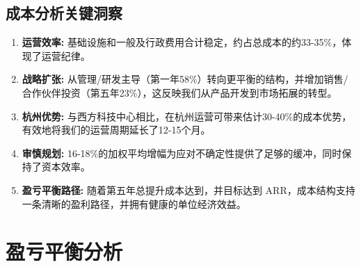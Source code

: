 \documentclass[11点, A4纸, 单面]{article}
\begin{document}
\begin{table}[H]
\centering
\caption{基础设施与平台投资回报率}
\label{tab:infrastructure_roi}
\end{table}

\subsection{成本分析关键洞察}

\begin{enumerate}
    \item \textbf{运营效率:} 基础设施和一般及行政费用合计稳定，约占总成本的约33-35\%，体现了运营纪律。
    
    \item \textbf{战略扩张:} 从管理/研发主导（第一年58\%）转向更平衡的结构，并增加销售/合作伙伴投资（第五年23\%），这反映我们从产品开发到市场拓展的转型。
    
    \item \textbf{杭州优势:} 与西方科技中心相比，在杭州运营可带来估计30-40\%的成本优势，有效地将我们的运营周期延长了12-15个月。
    
    \item \textbf{审慎规划:} 16-18\%的加权平均增幅为应对不确定性提供了足够的缓冲，同时保持了资本效率。
    
    \item \textbf{盈亏平衡路径:} 随着第五年总提升成本达到，并目标达到 ARR，成本结构支持一条清晰的盈利路径，并拥有健康的单位经济效益。
\end{enumerate}



\section{盈亏平衡分析}
\end{document}
